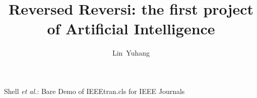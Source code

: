 \documentclass[journal]{IEEEtran}
\begin{document}
		\title{Reversed Reversi: the first project of Artificial Intelligence}
		
		\author{Lin~Yuhang}%
		
		
	
	
	
	{Shell \MakeLowercase{\textit{et al.}}: Bare Demo of IEEEtran.cls for IEEE Journals}
	
\end{document}
